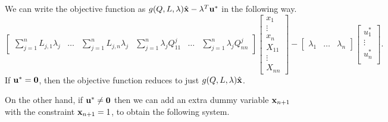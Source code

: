 \vspace*{0.3in}
We can write the objective function as $g(Q,L,\lambda)\hat{\mathbf{x}}-\lambda^T\mathbf{u}^*$ in the following way.
%
\[
  \begin{bmatrix}
    \sum\limits_{j=1}^nL_{j,1}\lambda_j & %
    \dots &
    \sum\limits_{j=1}^nL_{j,n}\lambda_j &
    \sum\limits_{j=1}^n\lambda_jQ_{11}^j & %
    \dots &
    \sum\limits_{j=1}^n\lambda_jQ_{nn}^j 
  \end{bmatrix}
%  
  \begin{bmatrix}
    x_1 \\ 
    \vdots \\
    x_n \\
    X_{11} \\ 
    \vdots \\
    X_{nn} 
  \end{bmatrix}%
  -
  \begin{bmatrix}
    \lambda_1 &  \dots & \lambda_n 
  \end{bmatrix}
%
  \begin{bmatrix}
    u^*_1 \\ 
    \vdots \\
    u^*_n \\
  \end{bmatrix}.%
\]
If $\mathbf{u}^*=\mathbf{0}$, then the objective function reduces to just $g(Q,L,\lambda)\hat{\mathbf{x}}$.

\vspace*{0.3in}
On the other hand, if $\mathbf{u}^*\neq \mathbf{0}$ then we can add an extra dummy variable $\mathbf{x}_{n+1}$ with the constraint $\mathbf{x}_{n+1}=1$, to obtain the following system.

